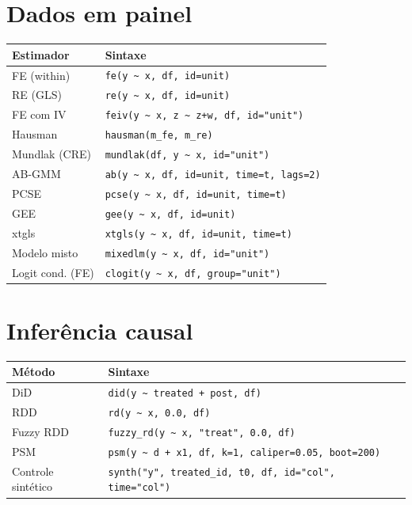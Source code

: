 \section{Dados em painel}

\begin{center}
\begin{tabular}{ll}
\toprule
\textbf{Estimador} & \textbf{Sintaxe} \\
\midrule
FE (within)     & \texttt{fe(y \textasciitilde{} x, df, id=unit)} \\
RE (GLS)        & \texttt{re(y \textasciitilde{} x, df, id=unit)} \\
FE com IV       & \texttt{feiv(y \textasciitilde{} x, z \textasciitilde{} z+w, df, id="unit")} \\
Hausman         & \texttt{hausman(m\_fe, m\_re)} \\
Mundlak (CRE)   & \texttt{mundlak(df, y \textasciitilde{} x, id="unit")} \\
AB-GMM          & \texttt{ab(y \textasciitilde{} x, df, id=unit, time=t, lags=2)} \\
PCSE            & \texttt{pcse(y \textasciitilde{} x, df, id=unit, time=t)} \\
GEE             & \texttt{gee(y \textasciitilde{} x, df, id=unit)} \\
xtgls           & \texttt{xtgls(y \textasciitilde{} x, df, id=unit, time=t)} \\
Modelo misto    & \texttt{mixedlm(y \textasciitilde{} x, df, id="unit")} \\
Logit cond. (FE)& \texttt{clogit(y \textasciitilde{} x, df, group="unit")} \\
\bottomrule
\end{tabular}
\end{center}

\section{Inferência causal}

\begin{center}
\begin{tabular}{ll}
\toprule
\textbf{Método} & \textbf{Sintaxe} \\
\midrule
DiD              & \texttt{did(y \textasciitilde{} treated + post, df)} \\
RDD              & \texttt{rd(y \textasciitilde{} x, 0.0, df)} \\
Fuzzy RDD        & \texttt{fuzzy\_rd(y \textasciitilde{} x, "treat", 0.0, df)} \\
PSM              & \texttt{psm(y \textasciitilde{} d + x1, df, k=1, caliper=0.05, boot=200)} \\
Controle sintético & \texttt{synth("y", treated\_id, t0, df, id="col", time="col")} \\
\bottomrule
\end{tabular}
\end{center}

